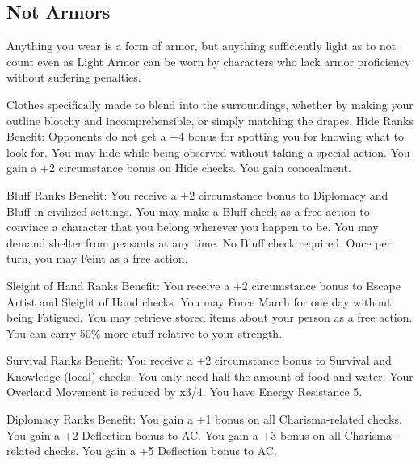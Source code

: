 \subsection{Not Armors}
Anything you wear is a form of armor, but anything sufficiently light as to not count even as Light Armor can be worn by characters who lack armor proficiency without suffering penalties.\\

\begin{multicols}{2}

{Clothes specifically made to blend into the surroundings, whether by making your outline blotchy and incomprehensible, or simply matching the drapes.}
{Hide Ranks Benefit:}
{Opponents do not get a +4 bonus for spotting you for knowing what to look for.}
{You may hide while being observed without taking a special action.}
{You gain a +2 circumstance bonus on Hide checks.}
{You gain concealment.}

{Bluff Ranks Benefit:}
{You receive a +2 circumstance bonus to Diplomacy and Bluff in civilized settings.}
{You may make a Bluff check as a free action to convince a character that you belong wherever you happen to be.}
{You may demand shelter from peasants at any time. No Bluff check required.}
{Once per turn, you may Feint as a free action.}

{Sleight of Hand Ranks Benefit:}
{You receive a +2 circumstance bonus to Escape Artist and Sleight of Hand checks.}
{You may Force March for one day without being Fatigued.}
{You may retrieve stored items about your person as a free action.}
{You can carry 50\% more stuff relative to your strength.}

{Survival Ranks Benefit:}
{You receive a +2 circumstance bonus to Survival and Knowledge (local) checks.}
{You only need half the amount of food and water.}
{Your Overland Movement is reduced by x3/4.}
{You have Energy Resistance 5.}

{Diplomacy Ranks Benefit:}
{You gain a +1 bonus on all Charisma-related checks.}
{You gain a +2 Deflection bonus to AC.}
{You gain a +3 bonus on all Charisma-related checks.}
{You gain a +5 Deflection bonus to AC.}


\end{multicols}
